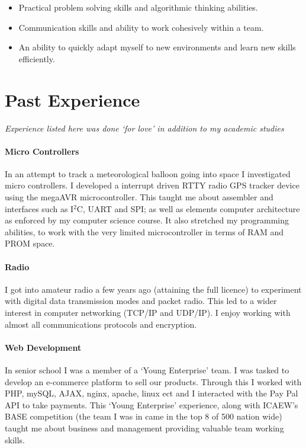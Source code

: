 \documentclass[9pt,a4paper]{article}
\begin{document}
\begin{multicols*}{2}
\begin{itemize}
\item Practical problem solving skills and algorithmic thinking abilities.

\item Communication skills and ability to work cohesively within a team.

\item An ability to quickly adapt myself to new environments and learn new skills efficiently.
\end{itemize}

\section*{Past Experience}
\textit{Experience listed here was done `for love' in addition to my academic studies}

\paragraph{Micro Controllers} In an attempt to track a meteorological balloon going into space I investigated micro controllers.
I developed a interrupt driven RTTY radio GPS tracker device using the megaAVR microcontroller.
This taught me about assembler and interfaces such as I$^2$C, UART and SPI;
as well as elements computer architecture as enforced by my computer science course.
It also stretched my programming abilities, to work with the very limited microcontroller in terms of RAM and PROM space.
\vspace*{-0.1cm}
\paragraph{Radio} I got into amateur radio a few years ago (attaining the full licence) to experiment with digital data transmission modes and packet radio.
This led to a wider interest in computer networking (TCP/IP and UDP/IP).
I enjoy working with almost all communications protocols and encryption.
\vspace*{-0.1cm}
\paragraph{Web Development} In senior school I was a member of a `Young Enterprise' team.
I was tasked to develop an e-commerce platform to sell our products.
Through this I worked with PHP, mySQL, AJAX, nginx, apache, linux ect
and I interacted with the Pay Pal API to take payments.
This `Young Enterprise' experience, along with ICAEW's BASE competition (the team I was in came in the top 8 of 500 nation wide) taught me about business and management providing valuable team working skills.
\vspace*{-0.1cm}

\end{multicols*}
\end{document}
